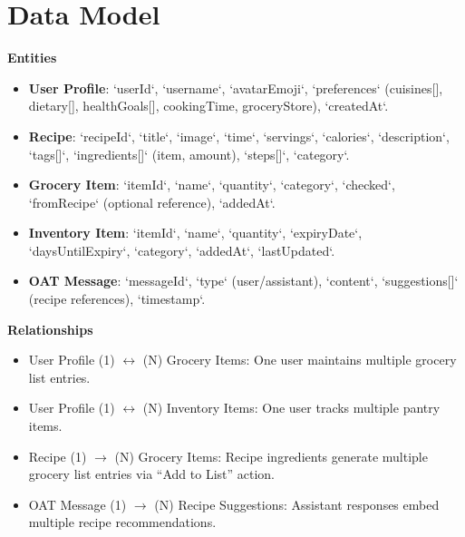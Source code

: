 \documentclass[12pt]{article}
\begin{document}
\section{Data Model}
\textbf{Entities}
\begin{itemize}
  \item \textbf{User Profile}: `userId`, `username`, `avatarEmoji`, `preferences` (cuisines[], dietary[], healthGoals[], cookingTime, groceryStore), `createdAt`.
  \item \textbf{Recipe}: `recipeId`, `title`, `image`, `time`, `servings`, `calories`, `description`, `tags[]`, `ingredients[]` (item, amount), `steps[]`, `category`.
  \item \textbf{Grocery Item}: `itemId`, `name`, `quantity`, `category`, `checked`, `fromRecipe` (optional reference), `addedAt`.
  \item \textbf{Inventory Item}: `itemId`, `name`, `quantity`, `expiryDate`, `daysUntilExpiry`, `category`, `addedAt`, `lastUpdated`.
  \item \textbf{OAT Message}: `messageId`, `type` (user/assistant), `content`, `suggestions[]` (recipe references), `timestamp`.
\end{itemize}
\textbf{Relationships}
\begin{itemize}
  \item User Profile (1) $\leftrightarrow$ (N) Grocery Items: One user maintains multiple grocery list entries.
  \item User Profile (1) $\leftrightarrow$ (N) Inventory Items: One user tracks multiple pantry items.
  \item Recipe (1) $\rightarrow$ (N) Grocery Items: Recipe ingredients generate multiple grocery list entries via ``Add to List'' action.
  \item OAT Message (1) $\rightarrow$ (N) Recipe Suggestions: Assistant responses embed multiple recipe recommendations.
\end{itemize}
\end{document}
